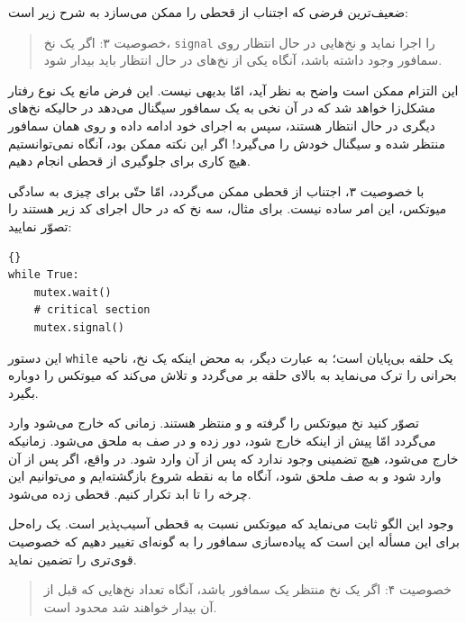 \documentclass{book}
\begin{document}
    ضعیف‌ترین فرضی که اجتناب از قحطی را ممکن می‌سازد به شرح زیر است:

\begin{quote}
    خصوصیت ۳: اگر یک نخ، {\tt signal} را اجرا نماید و نخ‌هایی در حال انتظار روی سمافور وجود داشته باشد،
    آنگاه یکی از نخ‌های در حال انتظار باید بیدار شود. 
\end{quote}

    این التزام ممکن است واضح به نظر آید، امّا بدیهی نیست. این فرض مانع یک نوع رفتار مشکل‌زا خواهد شد که در آن 
    نخی به یک سمافور سیگنال می‌دهد در حالیکه نخ‌های دیگری در حال انتظار هستند، سپس به اجرای خود ادامه داده و روی همان سمافور منتظر شده و 
    سیگنال خودش را می‌گیرد! 
    اگر این نکته ممکن بود،   آنگاه نمی‌توانستیم هیچ کاری برای جلوگیری از قحطی انجام دهیم. 

    با خصوصیت ۳، اجتناب از قحطی ممکن می‌گردد، امّا حتّی برای چیزی به سادگی میوتکس، این امر ساده نیست. 
    برای مثال، سه نخ که در حال اجرای کد زیر هستند را تصوّر نمایید:
    
\begin{latin}
\begin{lstlisting}[title=\rl{حلقه میوتکس}]{}
while True:
    mutex.wait()
    # critical section 
    mutex.signal()
\end{lstlisting}
\end{latin}

    این دستور {\tt while} یک حلقه بی‌پایان است؛ به عبارت دیگر، به محض اینکه یک نخ، ناحیه بحرانی را ترک می‌نماید به بالای حلقه بر می‌گردد و 
    تلاش می‌کند که میوتکس را دوباره بگیرد. 

    تصوّر کنید نخ  میوتکس را گرفته و  و  منتظر هستند. 
    زمانی که  خارج می‌شود  وارد می‌گردد امّا پیش از اینکه   خارج شود،   دور زده و در صف به   ملحق می‌شود. 
    زمانیکه   خارج می‌شود، هیچ تضمینی وجود ندارد که  پس از آن   وارد شود. در واقع، اگر پس از آن  وارد شود و   
    به صف ملحق شود، آنگاه ما به نقطه  شروع بازگشته‌ایم و می‌توانیم این چرخه را تا ابد تکرار کنیم.  قحطی زده می‌شود. 

    وجود این الگو ثابت می‌نماید که میوتکس نسبت به قحطی آسیب‌پذیر است. 
    یک راه‌حل برای این مسأله این است که پیاده‌سازی سمافور را به گونه‌ای تغییر دهیم که خصوصیت قوی‌تری را تضمین نماید. 

\begin{quote}
    خصوصیت ۴: اگر یک نخ منتظر یک سمافور باشد، آنگاه تعداد نخ‌هایی که قبل از آن بیدار خواهند شد محدود است. 
\end{quote}
\end{document}
